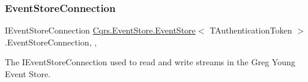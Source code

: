 \subsubsection{\texorpdfstring{Event\+Store\+Connection}{EventStoreConnection}}
{\footnotesize\ttfamily I\+Event\+Store\+Connection \hyperlink{classCqrs_1_1EventStore_1_1EventStore}{Cqrs.\+Event\+Store.\+Event\+Store}$<$ T\+Authentication\+Token $>$.Event\+Store\+Connection\hspace{0.3cm}{\ttfamily [get]}, {\ttfamily [set]}, {\ttfamily [protected]}}



The I\+Event\+Store\+Connection used to read and write streams in the Greg Young Event Store. 

